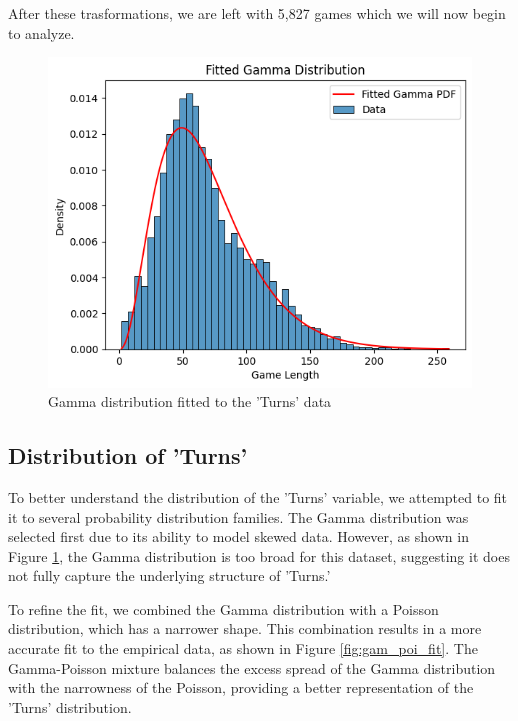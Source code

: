 \documentclass[conference]{IEEEtran}
\begin{document}
After these trasformations, we are left with 5,827 games which we will now begin to analyze.

\begin{figure}[H]
    \centering
    \includegraphics[width=0.8\linewidth]{gamma_fit.png}
    \caption{Gamma distribution fitted to the 'Turns' data}
    \label{fig:gamma_fit}
\end{figure}
\subsection{Distribution of 'Turns'}

To better understand the distribution of the 'Turns' variable, we attempted to fit it to several probability distribution families. The Gamma distribution was selected first due to its ability to model skewed data. However, as shown in Figure \ref{fig:gamma_fit}, the Gamma distribution is too broad for this dataset, suggesting it does not fully capture the underlying structure of 'Turns.'

To refine the fit, we combined the Gamma distribution with a Poisson distribution, which has a narrower shape. This combination results in a more accurate fit to the empirical data, as shown in Figure \ref{fig:gam_poi_fit}. The Gamma-Poisson mixture balances the excess spread of the Gamma distribution with the narrowness of the Poisson, providing a better representation of the 'Turns' distribution.
\end{document}
